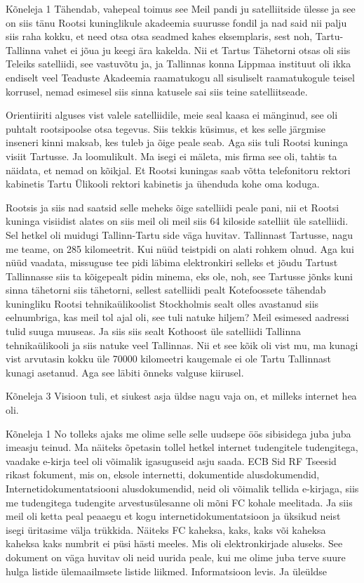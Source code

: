 Kõneleja 1
Tähendab, vahepeal toimus see Meil pandi ju satelliitside ülesse ja see on siis tänu Rootsi kuninglikule akadeemia suurusse fondil ja nad said nii palju siis raha kokku, et need otsa otsa seadmed kahes eksemplaris, sest noh, Tartu-Tallinna vahet ei jõua ju keegi ära kakelda. Nii et Tartus Tähetorni otsas oli siis Teleiks satelliidi, see vastuvõtu ja, ja Tallinnas konna Lippmaa instituut oli ikka endiselt veel Teaduste Akadeemia raamatukogu all sisuliselt raamatukogule teisel korrusel, nemad esimesel siis sinna katusele sai siis teine satelliitseade. 

Orientiiriti alguses vist valele satelliidile, meie seal kaasa ei mänginud, see oli puhtalt rootsipoolse otsa tegevus. Siis tekkis küsimus, et kes selle järgmise inseneri kinni maksab, kes tuleb ja õige peale seab. Aga siis tuli Rootsi kuninga visiit Tartusse. Ja loomulikult. Ma isegi ei mäleta, mis firma see oli, tahtis ta näidata, et nemad on kõikjal. Et Rootsi kuningas saab võtta telefonitoru rektori kabinetis Tartu Ülikooli rektori kabinetis ja ühenduda kohe oma koduga. 

Rootsis ja siis nad saatsid selle meheks õige satelliidi peale pani, nii et Rootsi kuninga visiidist alates on siis meil oli meil siis 64 kiloside satelliit üle satelliidi. Sel hetkel oli muidugi Tallinn-Tartu side väga huvitav. Tallinnast Tartusse, nagu me teame, on 285 kilomeetrit. Kui nüüd teistpidi on alati rohkem olnud. Aga kui nüüd vaadata, missuguse tee pidi läbima elektronkiri selleks et jõudu Tartust Tallinnasse siis ta kõigepealt pidin minema, eks ole, noh, see Tartusse jõnks kuni sinna tähetorni siis tähetorni, sellest satelliidi pealt Kotefoossete tähendab kuningliku Rootsi tehnikaülikoolist Stockholmis sealt olles avastanud siis eelnumbriga, kas meil tol ajal oli, see tuli natuke hiljem? Meil esimesed aadressi tulid suuga muuseas. Ja siis siis sealt Kothoost üle satelliidi Tallinna tehnikaülikooli ja siis natuke veel Tallinnas. Nii et see kõik oli vist mu, ma kunagi vist arvutasin kokku üle 70000 kilomeetri kaugemale ei ole Tartu Tallinnast kunagi asetanud. Aga see läbiti õnneks valguse kiirusel. 

Kõneleja 3
Visioon tuli, et siukest asja üldse nagu vaja on, et milleks internet hea oli. 

Kõneleja 1
No tolleks ajaks me olime selle selle uudsepe öös sibisidega juba juba imeasju teinud. Ma näiteks õpetasin tollel hetkel internet tudengitele tudengitega, vaadake e-kirja teel oli võimalik igasuguseid asju saada. ECB Sid RF Tseesid rikast fokument, mis on, eksole internetti, dokumentide alusdokumendid, Internetidokumentatsiooni alusdokumendid, neid oli võimalik tellida e-kirjaga, siis me tudengitega tudengite arvestusülesanne oli mõni FC kohale meelitada. Ja siis meil oli ketta peal peaaegu et kogu internetidokumentatsioon ja üksikud neist isegi üritasime välja trükkida. Näiteks FC kaheksa, kaks, kaks või kaheksa kaheksa kaks numbrit ei püsi hästi meeles. Mis oli elektronkirjade aluseks. See dokument on väga huvitav oli neid uurida peale, kui me olime juba terve suure hulga listide ülemaailmsete listide liikmed. Informatsioon levis. Ja üleüldse 

